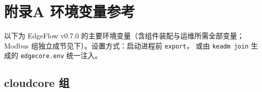 \chapter{附录A 环境变量参考}
\label{app:A}

以下为 EdgeFlow v0.7.0 的主要环境变量（含组件装配与运维所需全部变量；
Modbus 组独立成节见下）。设置方式：启动进程前 \texttt{export}，
或由 \texttt{keadm join} 生成的 \texttt{edgecore.env} 统一注入。

\section{cloudcore 组}


